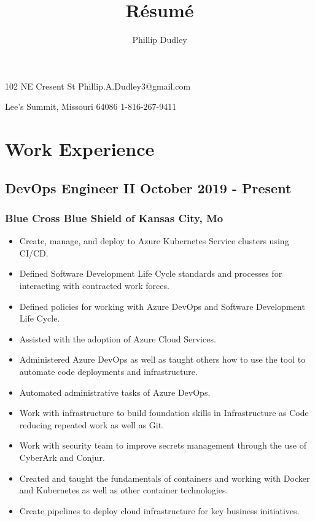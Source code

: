 \documentclass{article}
\title{R\'esum\'e}
\author{Phillip Dudley}
\makeatletter
\renewcommand{\maketitle}{
  \begin{center}
  {\huge\bfseries\theauthor}

  \vspace{.25em}

  102 NE Cresent St
  \hfill
  Phillip.A.Dudley3@gmail.com

  Lee's Summit, Missouri 64086
  \hfill
  1-816-267-9411
\end{center}
}
\makeatother
\begin{document}
  \maketitle

  \section{Work Experience}

    \subsection{DevOps Engineer II {\hfill} October 2019 - Present}

      \subsubsection{Blue Cross Blue Shield of Kansas City, Mo}

        \begin{scriptsize}
        \begin{itemize}

          \item Create, manage, and deploy to Azure Kubernetes Service
            clusters using CI/CD.

          \item Defined Software Development Life Cycle standards and processes
            for interacting with contracted work forces.

          \item Defined policies for working with Azure DevOps and Software
            Development Life Cycle.

          \item Assisted with the adoption of Azure Cloud Services.

          \item Administered Azure DevOps as well as taught others how to use
            the tool to automate code deployments and infrastructure.

          \item Automated administrative tasks of Azure DevOps.

          \item Work with infrastructure to build foundation skills in
            Infrastructure as Code reducing repeated work as well as Git.

          \item Work with security team to improve secrets management through
            the use of CyberArk and Conjur.

          \item Created and taught the fundamentals of containers and working
            with Docker and Kubernetes as well as other container technologies.

          \item Create pipelines to deploy cloud infrastructure for key
            business initiatives.

        \end{itemize}
        \end{scriptsize}
\end{document}
